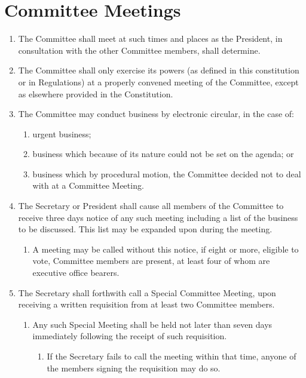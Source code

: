 \documentclass[a4paper]{article}
\begin{document}
\section{Committee Meetings} \label{sec:committee_meetings}
\begin{enumerate}
    \item The Committee shall meet at such times and places as the President, in consultation with the other Committee members, shall determine.
    \item The Committee shall only exercise its powers (as defined in this constitution or in Regulations) at a properly convened meeting of the Committee, except as elsewhere provided in the Constitution.
    \item The Committee may conduct business by electronic circular, in the case of:
          \begin{enumerate}
              \item urgent business;
              \item business which because of its nature could not be set on the agenda; or
              \item business which by procedural motion, the Committee decided not to deal with at a Committee Meeting.
          \end{enumerate}
    \item The Secretary or President shall cause all members of the Committee to receive three days notice of any such meeting including a list of the business to be discussed. This list may be expanded upon during the meeting.
          \begin{enumerate}
              \item A meeting may be called without this notice, if eight or more, eligible to vote, Committee members are present, at least four of whom are executive office bearers.
          \end{enumerate}
    \item The Secretary shall forthwith call a Special Committee Meeting, upon receiving a written requisition from at least two Committee members.
          \begin{enumerate}
              \item Any such Special Meeting shall be held not later than seven days immediately following the receipt of such requisition.
                    \begin{enumerate}
                        \item If the Secretary fails to call the meeting within that time, anyone of the members signing the requisition may do so.

\end{enumerate}
\end{enumerate}
\end{enumerate}
\end{document}

